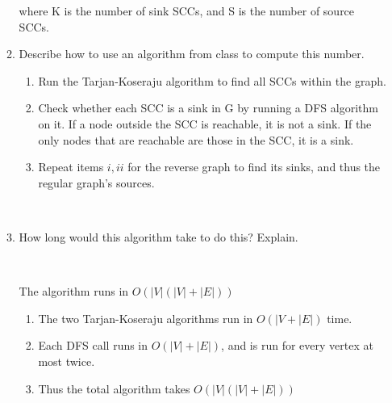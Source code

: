 \documentclass[12pt, letterpaper]{article}
\begin{document}
\begin{enumerate}
\begin{enumerate}
where K is the number of sink SCCs, and S is the number of source SCCs.
\-\ \newline

\item Describe how to use an algorithm from class to compute this number.

\begin {enumerate}
\item Run the Tarjan-Koseraju algorithm to find all SCCs within the graph. 
\item Check whether each SCC is a sink in G by running a DFS algorithm on it. If a node outside the SCC is reachable, it is not a sink. If the only nodes that are reachable are those in the SCC, it is a sink.
\item Repeat items \(i, ii\) for the reverse graph to find its sinks, and thus the regular graph's sources. 

\end {enumerate}

\-\ \newline
\item How long would this algorithm take to do this?  Explain.  

\-\ \newline

The algorithm runs in \(O( |V| (|V| + |E|) )\)

\begin {enumerate}
\item The two Tarjan-Koseraju algorithms run in \(O(|V + |E|)\) time.
\item Each DFS call runs in \(O(|V| + |E|)\), and is run for every vertex at most twice. 
\item Thus the total algorithm takes \(O(|V|(|V| + |E|))\)
\end {enumerate}

\end{enumerate}


\end{enumerate}
\end{document}
